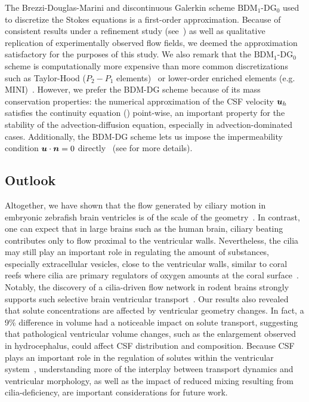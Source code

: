 \documentclass{WileyMSP-template}
\begin{document}
The Brezzi-Douglas-Marini and discontinuous Galerkin scheme
$\mathrm{BDM}_1$-$\mathrm{DG}_0$
used to discretize the Stokes equations is a first-order
approximation. Because of consistent results under a refinement
study (see~)
as well as qualitative replication of experimentally
observed flow fields, we deemed the approximation satisfactory
for the purposes of this study.
We also remark that the $\mathrm{BDM}_1$-$\mathrm{DG}_0$ scheme
is computationally more expensive
than more common discretizations such as 
Taylor-Hood ($P_2-P_{1}$ elements)~\cite{Stenberg1990ErrorProblem} or lower-order enriched
elements (e.g. MINI)~\cite{Brezzi2011MixedMethods}.
However, we prefer the BDM-DG scheme because of its mass conservation properties: the numerical approximation of
the CSF velocity $\bm{u}_h$ satisfies the continuity equation () point-wise, an important property for the stability of the advection-diffusion
equation, especially in advection-dominated cases.
\cite{cesmelioglu2022compatible, johnson2009numerical, gresho1998incompressible}
Additionally, the BDM-DG scheme 
lets us impose the impermeability condition $\bm{u}\cdot\bm{n}=0$
directly~\cite{Brezzi1985TwoProblems} (see  for more details).

\subsection{Outlook}
Altogether, we have shown that the flow
generated by ciliary motion in embryonic zebrafish brain ventricles
is of the scale of the geometry~\cite{Olstad2019CiliaryDevelopment}.
In contrast, one can expect that in large brains such as the
human brain, ciliary beating contributes only to flow proximal
to the ventricular walls\cite{Siyahhan2014FlowVentricles}.
Nevertheless, the cilia may still play an important role in regulating the
amount of substances, especially extracellular vesicles,
close to the ventricular walls,
similar to coral reefs where cilia are primary regulators of
oxygen amounts at the coral surface~\cite{Pacherres2022CiliaryProduction}.
Notably, the discovery of a cilia-driven flow network
in rodent brains strongly supports such selective
brain ventricular transport~\cite{Faubel2016Cilia-basedVentricles}.
Our results also revealed that solute concentrations are affected
by ventricular geometry changes.
In fact, a 9\% difference in volume
had a noticeable impact on solute transport,
suggesting that pathological ventricular volume changes,
such as the enlargement observed in hydrocephalus,
could affect CSF distribution and composition.
Because CSF plays an important role in the regulation of solutes
within the ventricular system~\cite{yamada2021cerebrospinal},
understanding more of the interplay between
transport dynamics and ventricular morphology,
as well as the impact of
reduced mixing resulting from cilia-deficiency,
are important considerations for future work.
\end{document}
